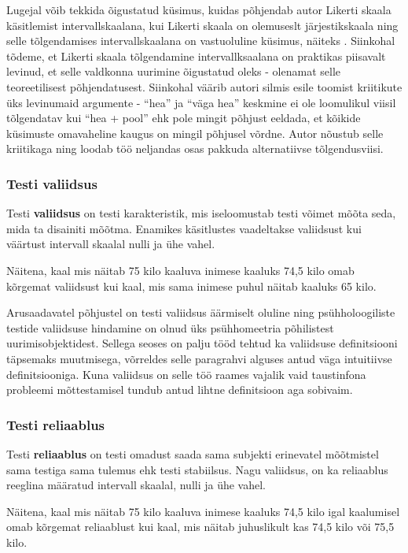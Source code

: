 \documentclass[a4paper,12pt]{article}
\numberwithin{equation}{section}
\theoremstyle{definition}
\begin{document}
Lugejal võib tekkida õigustatud k\"usimus, kuidas põhjendab autor Likerti skaala käsitlemist intervallskaalana, kui Likerti skaala on olemuseslt järjestikskaala ning selle tõlgendamises intervallskaalana on vastuoluline küsimus, näiteks \cite{Jamieson2004}. Siinkohal tõdeme, et Likerti skaala tõlgendamine intervallksaalana on praktikas piisavalt levinud, et selle valdkonna uurimine õigustatud oleks - olenamat selle teoreetilisest põhjendatusest.  Siinkohal väärib autori silmis esile toomist kriitikute \"uks levinumaid argumente -  "`hea"'  ja "`väga hea"'  keskmine ei ole  loomulikul viisil tõlgendatav kui "`hea + pool"' ehk pole mingit põhjust eeldada, et kõikide küsimuste omavaheline kaugus on mingil põhjusel võrdne. Autor nõustub selle kriitikaga ning loodab töö neljandas osas pakkuda alternatiivse tõlgendusviisi. 

\subsubsection{Testi valiidsus}

Testi \textbf{valiidsus} on testi karakteristik, mis iseloomustab testi võimet mõõta seda, mida ta disainiti mõõtma. Enamikes käsitlustes vaadeltakse valiidsust kui väärtust intervall skaalal nulli ja ühe vahel.

Näitena, kaal mis näitab 75 kilo kaaluva inimese kaaluks 74,5 kilo omab kõrgemat valiidsust kui kaal, mis sama inimese puhul näitab kaaluks 65 kilo.   

Arusaadavatel põhjustel on testi valiidsus äärmiselt oluline ning psühholoogiliste testide valiidsuse hindamine on olnud üks psühhomeetria põhilistest uurimisobjektidest. Sellega seoses on palju tööd tehtud ka valiidsuse definitsiooni täpsemaks muutmisega, võrreldes selle paragrahvi alguses antud väga intuitiivse definitsiooniga. Kuna valiidsus on selle töö raames vajalik vaid taustinfona probleemi mõttestamisel tundub antud lihtne definitsioon aga sobivaim. 

\subsubsection{Testi reliaablus}

Testi \textbf{reliaablus} on testi omadust saada sama subjekti erinevatel mõõtmistel sama testiga sama tulemus ehk testi stabiilsus. Nagu valiidsus, on ka reliaablus reeglina määratud intervall skaalal, nulli ja ühe vahel. 

Näitena, kaal mis näitab 75 kilo kaaluva inimese kaaluks 74,5 kilo igal kaalumisel omab kõrgemat reliaablust kui kaal, mis näitab juhuslikult kas 74,5 kilo või 75,5 kilo. 
\end{document}
